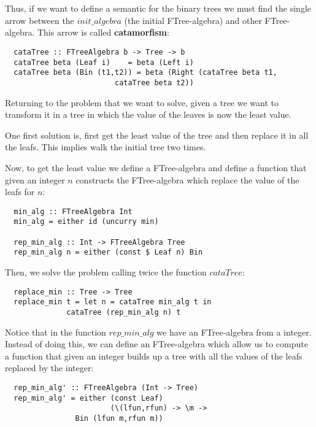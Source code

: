 \documentclass[a4paper,10pt]{article}
\begin{document}
\

\

Thus, if we want to define a semantic for the binary trees we must find the single arrow
between the $init\_algebra$ (the initial FTree-algebra) and other FTree-algebra. This arrow
is called \textbf{catamorfism}:

\begin{lstlisting}
  cataTree :: FTreeAlgebra b -> Tree -> b
  cataTree beta (Leaf i)    = beta (Left i)
  cataTree beta (Bin (t1,t2)) = beta (Right (cataTree beta t1,
					     cataTree beta t2))
\end{lstlisting}

Returning to the problem that we want to solve, given a tree we want to transform it
in a tree in which the value of the leaves is now the least value.

One first solution is, first get the least value of the tree and then replace it in
all the leafs. This implies walk the initial tree two times.

Now, to get the least value we define a FTree-algebra and define a function that
given an integer $n$ constructs the FTree-algebra which replace the value of the leafs
for $n$:

\begin{lstlisting}
  min_alg :: FTreeAlgebra Int
  min_alg = either id (uncurry min)

  rep_min_alg :: Int -> FTreeAlgebra Tree
  rep_min_alg n = either (const $ Leaf n) Bin
\end{lstlisting}

Then, we solve the problem calling twice the function $cataTree$:

\begin{lstlisting}
  replace_min :: Tree -> Tree
  replace_min t = let n = cataTree min_alg t in
		      cataTree (rep_min_alg n) t
\end{lstlisting}

Notice that in the function $rep\_min\_alg$ we have an FTree-algebra from a integer.
Instead of doing this, we can define an FTree-algebra which allow us to compute a
function that given an integer builds up a tree with all the values of the leafs
replaced by the integer:

\begin{lstlisting}
  rep_min_alg' :: FTreeAlgebra (Int -> Tree)
  rep_min_alg' = either (const Leaf) 
                        (\(lfun,rfun) -> \m -> 
			    Bin (lfun m,rfun m))
\end{lstlisting}
\end{document}
